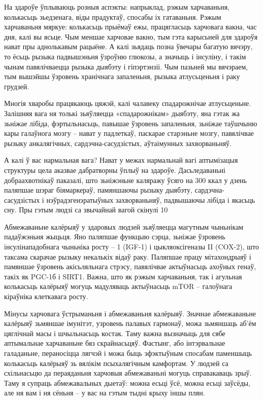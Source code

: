На здароўе ўплываюць розныя аспэкты: напрыклад, рэжым харчаваньня, колькасьць зьедзенага, віды прадуктаў, спосабы іх гатаваньня. Рэжым харчаваньня мяркуе: колькасьць прыёмаў ежы, працягласьць харчовага вакна, час дня, калі вы ясьце. Чым меншае харчовае вакно, тым гэта карысьней для здароўя нават пры аднолькавым рацыёне. А калі зьядаць позна ўвечары багатую вячэру, то ёсьць рызыка падвышэньня ўзроўню глюкозы, а значыць і інсуліну, і такім чынам павялічваецца рызыка дыябэту і гіпэртэнзіі. Чым пазьней мы вячэраем, тым вышэйшы ўзровень хранічнага запаленьня, рызыка атлусьценьня і раку грудзей.

Многія хваробы працякаюць цяжэй, калі чалавеку спадарожнічае атлусьценьне. Залішняя вага ня толькі зьяўляецца «спадарожнікам» дыябэту, яна гэтак жа зьніжае лібіда, фэртыльнасьць, павышае ўзровень запаленьня, зьніжае таўшчыню кары галаўнога мозгу – нават у падлеткаў, паскарае старэньне мозгу, павялічвае рызыку анкалягічных, сардэчна-сасудзістых, аўтаімунных захворваньняў.

А калі ў вас нармальная вага? Нават у межах нармальнай вагі аптымізацыя структуры цела аказвае дабратворны ўплыў на здароўе. Дасьледаваньні добраахвотнікаў паказалі, што зьніжэньне каляражу ўсяго на 300 ккал у дзень паляпшае шэраг біямаркераў, памяншаючы рызыку дыябэту, сардэчна-сасудзістых і нэўрадэгенэратыўных захворваньняў, падвышаючы лібіда і якасьць сну. Пры гэтым людзі са звычайнай вагой скінулі 10%

Абмежаваньне калёрыяў у здаровых людзей зьяўляецца магутным чыньнікам падаўжэньня жыцьця. Яно паляпшае функцыю сэрца, зьніжае ўзровень інсулінападобнага чыньніка росту – 1 (IGF-1) і цыкляоксігеназы II (COX-2), што таксама скарачае рызыку некалькіх відаў раку. Паляпшае працу мітахондрыяў і памяншае ўзровень акісьляльнага стрэсу, павялічвае актыўнасьць ахоўных генаў, такіх як PGC-1б і SIRT1. Важна, што як рэжым харчаваньня, так і агульная колькасьць калёрыяў могуць мадуляваць актыўнасьць mTOR – галоўнага кіраўніка клеткавага росту.

Мінусы харчовага ўстрыманьня і абмежаваньня калёрыяў. Значнае абмежаваньне калёрыяў зьмяншае імунітэт, узровень палавых гармонаў, можа зьмяншаць аб'ём цяглічнай масы і шчыльнасьць костак. Таму важна вызначыць для сябе аптымальнае харчаваньне бяз скрайнасьцяў. Фастынг, або інтэрвальнае галаданьне, пераносіцца лягчэй і можа быць эфэктыўным спосабам паменшыць колькасьць калёрыяў зь вялікім псыхалягічным камфортам. У людзей са схільнасьцю да пераяданьня харчовыя абмежаваньні могуць справакаваць зрыў. Таму я супраць абмежавальных дыетаў: можна есьці ўсё, можна есьці заўсёды, але ня вам і ня сёньня – у вас на гэтым тыдні крыху іншы плян.

